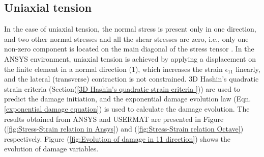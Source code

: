 \documentclass[12pt,openright,twoside]{report}
\begin{document}
\subsection{Uniaxial tension}
\indent\indent\indent In the case of uniaxial tension, the normal stress is present only in one direction, and two other normal stresses and all the shear stresses are zero, i.e., only one non-zero component is located on the main diagonal of the stress tensor \citep{ubt}.  In the ANSYS environment, uniaxial tension is achieved by applying a displacement on the finite element in a normal direction ($1$), which increases the strain $\epsilon_{11}$ linearly, and the lateral (transverse) contraction is not constrained. 3D Hashin's quadratic strain criteria (Section(\ref{3D Hashin's quadratic strain criteria })) are used to predict the damage initiation, and the exponential damage evolution law (Eqn.\ref{exponential damage equation}) is used to calculate the damage evolution. The results obtained from ANSYS and USERMAT are presented in Figure (\ref{fig:Stress-Strain relation in Ansys}) and (\ref{fig:Stress-Strain relation Octave}) respectively. Figure (\ref{fig:Evolution of damage in 11 direction}) shows the evolution of damage variables.\\ 
\end{document}
